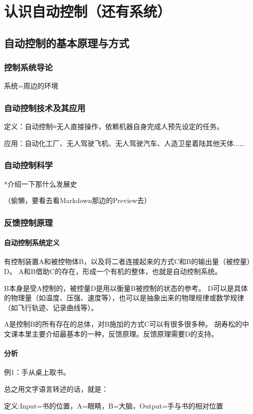 \documentclass[oneside,a4paper]{ctexbook}
\begin{document}
\chapter{认识自动控制（还有系统）}

\section{自动控制的基本原理与方式}
\subsection{控制系统导论}
系统=周边的环境
\subsection{自动控制技术及其应用}
定义：自动控制≈无人直接操作，依赖机器自身完成人预先设定的任务。

应用：自动化工厂、无人驾驶飞机、无人驾驶汽车、人造卫星着陆其他天体...\dots
\subsection{自动控制科学}
*介绍一下那什么发展史

（偷懒，要看去看Markdown那边的Preview去）

\subsection{反馈控制原理}
\subsubsection{自动控制系统定义}
有控制装置A和被控物体B，以及将二者连接起来的方式C和B的输出量（被控量）D。
A和B借助C的存在，形成一个有机的整体，也就是自动控制系统。

B本身是受A控制的，被控量D是用以衡量B被控制的状态的参考。
D可以是具体的物理量（如温度、压强、速度等），也可以是抽象出来的物理规律或数学规律（如飞行轨迹、记录曲线等）。

A是控制B的所有存在的总体，对B施加的方式C可以有很多很多种。
胡寿松的中文课本里主要介绍最基本的一种，反馈原理。反馈原理需要D的支持。
\subsubsection{分析}
例1：手从桌上取书。

总之用文字语言转述的话，就是：

定义:Input=书的位置，A=眼睛，B=大脑，Output=手与书的相对位置
\end{document}
